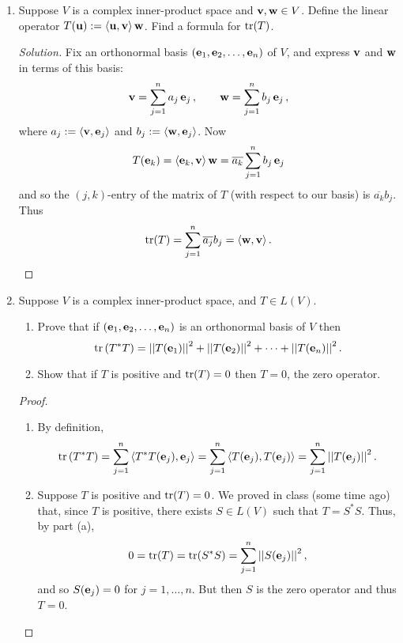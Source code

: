 \documentclass[11pt]{amsart}
\begin{document}
\begin{enumerate}[(1)]

\vspace{12pt}

\item Suppose $V$ is a complex inner-product space and $\mathbf v, \mathbf w \in V$.
Define the linear operator $T(\mathbf u) := \left< \mathbf u, \mathbf v \right> \mathbf w$. Find a formula for $\operatorname{tr}(T)$.

\begin{proof}[Solution]
Fix an orthonormal basis $\left( \mathbf e_1, \mathbf e_2, \dots, \mathbf e_n \right)$ of $V$, and express $\mathbf v$ and $\mathbf w$ in terms of this basis:
\[
  \mathbf v = \sum_{ j=1 }^n a_j \, \mathbf e_j \, ,
  \qquad
  \mathbf w = \sum_{ j=1 }^n b_j \, \mathbf e_j \, ,
\]
where $a_j := \left< \mathbf v, \mathbf e_j \right>$ and $b_j := \left< \mathbf w, \mathbf e_j \right>$.
Now
\[
  T(\mathbf e_k)
  = \left< \mathbf e_k, \mathbf v \right> \mathbf w
  = \overline{ a_k } \sum_{ j=1 }^n b_j \, \mathbf e_j
\]
and so the $(j,k)$-entry of the matrix of $T$ (with respect to our basis) is $\overline{ a_k } b_j$.
Thus
\[
  \operatorname{tr}(T)
  = \sum_{ j=1 }^n \overline{ a_j } b_j
  = \left< \mathbf w, \mathbf v \right> . \qedhere
\]
\end{proof}

\item Suppose $V$ is a complex inner-product space, and $T \in L(V)$.
  \begin{enumerate}
  \item Prove that if $\left( \mathbf e_1, \mathbf e_2, \dots, \mathbf e_n \right)$ is an orthonormal basis of $V$ then
  \[
    \operatorname{tr} \left( T^* T \right) = \left|\left|  T (\mathbf e_1)  \right|\right|^2 + \left|\left|  T (\mathbf e_2)  \right|\right|^2 + \dots + \left|\left|  T (\mathbf e_n)  \right|\right|^2 .
  \]
  \item Show that if $T$ is positive and $\operatorname{tr}(T) = 0$ then $T=0$, the zero operator.
  \end{enumerate}

\begin{proof}
\begin{enumerate}

\item By definition,
\[
  \operatorname{tr} \left( T^* T \right)
   = \sum_{ j=1 }^n \left<  T^* T(\mathbf e_j) ,  \mathbf e_j  \right>
   = \sum_{ j=1 }^n \left<  T(\mathbf e_j) ,  T(\mathbf e_j)  \right>
   = \sum_{ j=1 }^n \left|\left|  T(\mathbf e_j)  \right|\right|^2 .
\]

\item Suppose $T$ is positive and $\operatorname{tr}(T) = 0$.
We proved in class (some time ago) that, since $T$ is positive, there exists $S \in L(V)$ such that $T = S^* S$. Thus, by part (a),
\[
  0 = \operatorname{tr}(T)
    = \operatorname{tr}(S^* S)
    = \sum_{ j=1 }^n \left|\left|  S(\mathbf e_j)  \right|\right|^2 ,
\]
and so $S(\mathbf e_j) = 0$ for $j = 1, \dots, n$. But then $S$ is the zero operator and thus $T = 0$. \qedhere


\end{enumerate}
\end{proof}
\end{enumerate}
\end{document}
